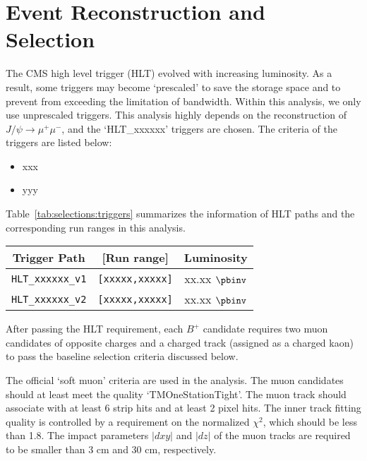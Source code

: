 \section{Event Reconstruction and Selection}
\label{sec:reconstruction}


The CMS high level trigger (HLT) evolved with increasing luminosity. As a result, some triggers may become `prescaled' to save the storage space and to prevent from exceeding the limitation of bandwidth. Within this analysis, we only use unprescaled triggers. 
This analysis highly depends on the reconstruction of $J/\psi\to{}\mu{}^{+}\mu{}^{-}$, and the `HLT\_xxxxxx' triggers are chosen. The criteria of the triggers are listed below:
\begin{itemize}
\item xxx %
\item yyy
\end{itemize}
Table~\ref{tab:selections:triggers} summarizes the information of HLT paths and the corresponding run ranges in this analysis.

\begin{minipage}{\textwidth}
    \centering
    \label{tab:selections:triggers}
    \begin{tabular}{|c|c|c|}
        \hline
            {Trigger Path}&{[Run range]} & Luminosity \\
        \hline
            \texttt{HLT\_xxxxxx\_v1}&\texttt{[xxxxx,xxxxx]}& xx.xx $\pbinv$\\
            \texttt{HLT\_xxxxxx\_v2}&\texttt{[xxxxx,xxxxx]}& xx.xx $\pbinv$\\            
        \hline
    \end{tabular}
\end{minipage}
\FloatBarrier

After passing the HLT requirement, each $B^+$ candidate requires two muon candidates of opposite charges and a charged track (assigned as a charged kaon) to pass the baseline selection criteria discussed below.

The official `soft muon' criteria are used in the analysis.
The muon candidates should at least meet the quality `TMOneStationTight'. The muon track should associate with
at least 6 strip hits and at least 2 pixel hits.
The inner track fitting quality is controlled by a requirement on the 
normalized $\chi{}^{2}$, which should be less than 1.8. 
The impact parameters $|dxy|$ and $|dz|$ of the muon tracks are required to be smaller than 3 cm and 30 cm, respectively.

